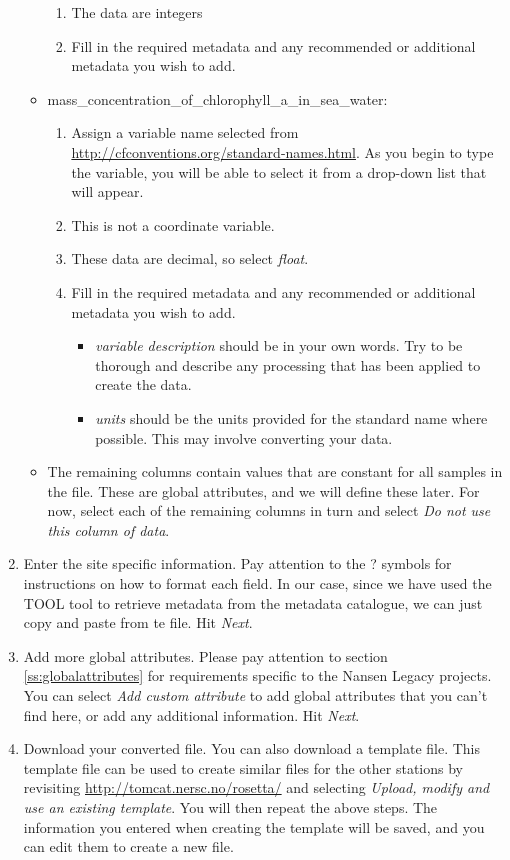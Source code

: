 \documentclass[a4paper,english, 11pt]{article}
\begin{document}
\begin{enumerate}
\begin{itemize}
\begin{enumerate}
\item The data are integers
\item Fill in the required metadata and any recommended or additional metadata you wish to add. 
\end{enumerate}
\item mass\_concentration\_of\_chlorophyll\_a\_in\_sea\_water:
\begin{enumerate}
\item Assign a variable name selected from \url{http://cfconventions.org/standard-names.html}. As you begin to type the variable, you will be able to select it from a drop-down list that will appear.
\item This is not a coordinate variable.
\item These data are decimal, so select \textit{float}.
\item Fill in the required metadata and any recommended or additional metadata you wish to add. 
\begin{itemize}
\item \textit{variable description} should be in your own words. Try to be thorough and describe any processing that has been applied to create the data. 
\item \textit{units} should be the units provided for the standard name where possible. This may involve converting your data.
\end{itemize}
\end{enumerate}
\item The remaining columns contain values that are constant for all samples in the file. These are global attributes, and we will define these later. For now, select each of the remaining columns in turn and select \textit{Do not use this column of data}.
\end{itemize}
\item Enter the site specific information. Pay attention to the ? symbols for instructions on how to format each field. In our case, since we have used the TOOL tool to retrieve metadata from the metadata catalogue, we can just copy and paste from te file. Hit \textit{Next}.
\item Add more global attributes. Please pay attention to section \ref{ss:globalattributes} for requirements specific to the Nansen Legacy projects. You can select \textit{Add custom attribute} to add global attributes that you can't find here, or add any additional information. Hit \textit{Next}.
\item Download your converted file. You can also download a template file. This template file can be used to create similar files for the other stations by revisiting \url{http://tomcat.nersc.no/rosetta/} and selecting \textit{Upload, modify and use an existing template}. You will then repeat the above steps. The information you entered when creating the template will be saved, and you can edit them to create a new file.
\end{enumerate}
\end{document}
